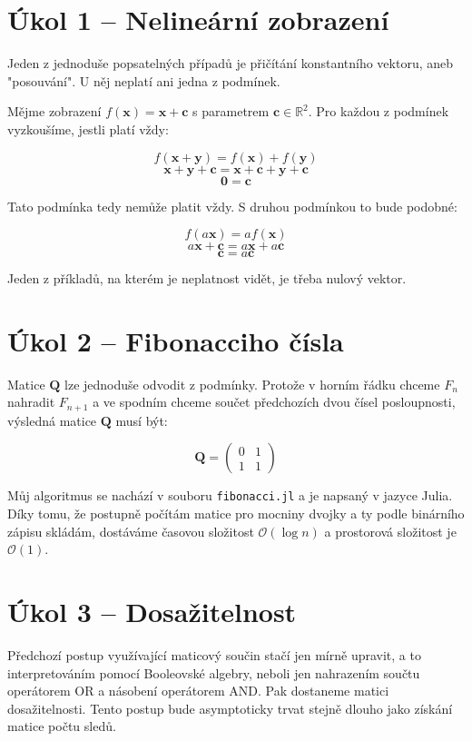\documentclass{fkssolpub}
\author{Ondřej Sedláček}
\begin{document}
\section{Úkol 1 -- Nelineární zobrazení}

Jeden z jednoduše popsatelných případů je přičítání konstantního
vektoru, aneb "posouvání". U něj neplatí ani jedna z podmínek.

Mějme zobrazení $f(\mathbf{x}) = \mathbf{x} + \mathbf{c}$ s parametrem
$\mathbf{c} \in \mathbb{R}^2$. Pro každou z podmínek vyzkoušíme, jestli platí
vždy:

\[
  f(\mathbf{x} + \mathbf{y}) = f(\mathbf{x}) + f(\mathbf{y})
\]
\[
  \mathbf{x} + \mathbf{y} + \mathbf{c} = \mathbf{x} + \mathbf{c} + \mathbf{y} + \mathbf{c}
\]
\[
  \mathbf{0} = \mathbf{c}
\]

Tato podmínka tedy nemůže platit vždy. S druhou podmínkou to bude podobné:

\[
  f(a \mathbf{x}) = a f(\mathbf{x})
\]
\[
  a \mathbf{x} + \mathbf{c} = a \mathbf{x} + a \mathbf{c}
\]
\[
  \mathbf{c} = a \mathbf{c}
\]

Jeden z příkladů, na kterém je neplatnost vidět, je třeba nulový vektor.


\section{Úkol 2 -- Fibonacciho čísla}

Matice $\mathbf{Q}$ lze jednoduše odvodit z podmínky. Protože v horním
řádku chceme $F_n$ nahradit $F_{n+1}$ a ve spodním chceme součet
předchozích dvou čísel posloupnosti, výsledná matice $\mathbf{Q}$ musí
být:

\[
  \mathbf{Q} = \begin{pmatrix}
    0 & 1 \\ 1 & 1
  \end{pmatrix}
\]

Můj algoritmus se nachází v souboru \verb|fibonacci.jl| 
a je napsaný v jazyce Julia. Díky tomu, že
postupně počítám matice pro mocniny dvojky a ty
podle binárního zápisu skládám, dostáváme časovou složitost
$\mathcal{O}(\log n)$ a prostorová složitost je $\mathcal{O}(1)$.

\section{Úkol 3 -- Dosažitelnost}

Předchozí postup využívající maticový součin stačí jen mírně upravit,
a to interpretováním pomocí Booleovské algebry, neboli jen 
nahrazením součtu operátorem OR a násobení operátorem AND.
Pak dostaneme matici dosažitelnosti. Tento postup bude asymptoticky
trvat stejně dlouho jako získání matice počtu sledů.
\end{document}
